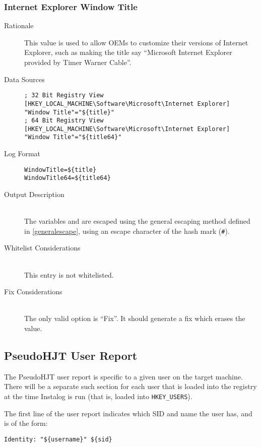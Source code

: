 \subsubsection{Internet Explorer Window Title}
\begin{description}
\item[Rationale] This value is used to allow OEMs to customize their versions of
Internet Explorer, such as making the title say ``Microsoft Internet Explorer
provided by Timer Warner Cable''.

\item[Data Sources] \hfill
\vspace{-\baselineskip}
\begin{verbatim}
; 32 Bit Registry View
[HKEY_LOCAL_MACHINE\Software\Microsoft\Internet Explorer]
"Window Title"="${title}"
; 64 Bit Registry View
[HKEY_LOCAL_MACHINE\Software\Microsoft\Internet Explorer]
"Window Title"="${title64}"
\end{verbatim}
\item[Log Format] \hfill
\vspace{-\baselineskip}
\begin{verbatim} 
WindowTitle=${title}
WindowTitle64=${title64}
\end{verbatim}
\item[Output Description] \hfill \\
The variables  and  are escaped using the general
escaping method defined in \ref{generalescape}, using an escape character of
the hash mark (\verb|#|).
\item[Whitelist Considerations] \hfill \\
This entry is not whitelisted.
\item[Fix Considerations] \hfill \\
The only valid option is ``Fix''. It should generate a fix which erases the
value.
\end{description}


\subsection{PseudoHJT User Report}
The PseudoHJT user report is specific to a given user on the target machine.
There will be a separate such section for each user that is loaded into the
registry at the time Instalog is run (that is, loaded into \verb|HKEY_USERS|).

The first line of the user report indicates which SID and name the user has, and
is of the form:
\begin{verbatim}
Identity: "${username}" ${sid}
\end{verbatim}

